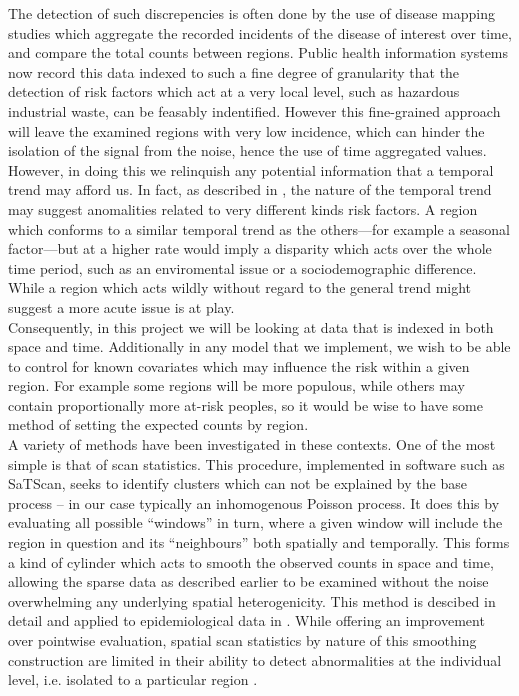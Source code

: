 \documentclass[11pt]{report}
\begin{document}
 The detection of such discrepencies is often done by the use of disease mapping studies which aggregate the recorded incidents of the disease of interest over time, and compare the total counts between regions. Public health information systems now record this data indexed to such a fine degree of granularity that the detection of risk factors which act at a very local level, such as hazardous industrial waste, can be feasably indentified. However this fine-grained approach will leave the examined regions with very low incidence, which can hinder the isolation of the signal from the noise, hence the use of time aggregated values. However, in doing this we relinquish any potential information that a temporal trend may afford us. In fact, as described in \citet{stability}, the nature of the temporal trend may suggest anomalities related to very different kinds risk factors. A region which conforms to a similar temporal trend as the others---for example a seasonal factor---but at a higher rate would imply a disparity which acts over the whole time period, such as an enviromental issue or a sociodemographic difference. While a region which acts wildly without regard to the general trend might suggest a more acute issue is at play. \\

Consequently, in this project we will be looking at data that is indexed in both space and time. Additionally in any model that we implement, we wish to be able to control for known covariates which may influence the risk within a given region. For example some regions will be more populous, while others may contain proportionally more at-risk peoples, so it would be wise to have some method of setting the expected counts by region. \\

A variety of methods have been investigated in these contexts. One of the most simple is that of scan statistics. This procedure, implemented in software such as SaTScan, seeks to identify clusters which can not be explained by the base process -- in our case typically an inhomogenous Poisson process. It does this by evaluating all possible ``windows'' in turn, where a given window will include the region in question and its ``neighbours'' both spatially and temporally. This forms a kind of cylinder which acts to smooth the observed counts in space and time, allowing the sparse data as described earlier to be examined without the noise overwhelming any underlying spatial heterogenicity. This method is descibed in detail and applied to epidemiological data in \citet{scan}. While offering an improvement over pointwise evaluation, spatial scan statistics by nature of this smoothing construction are limited in their ability to detect abnormalities at the individual level, i.e. isolated to a particular region \citep{baystdetect}.  \\
\end{document}
